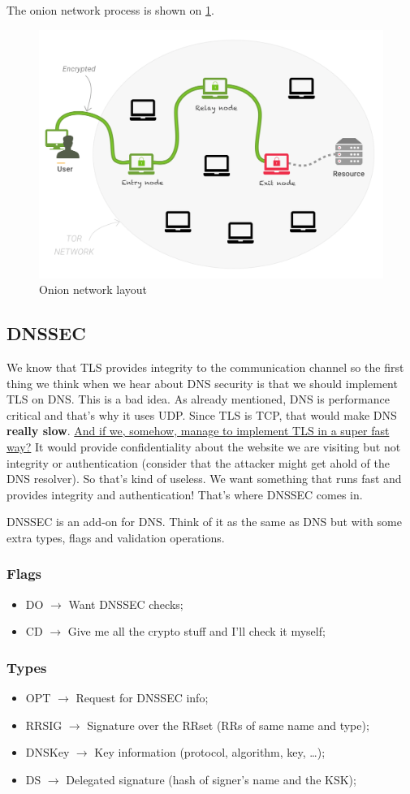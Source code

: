 \documentclass[11pt]{article}
\begin{document}
{The onion network process is shown on \ref{onion}.

\begin{figure}[htbp]
\centering
\includegraphics[height=0.5\textwidth]{res/onion.png}
\caption{\label{onion}
Onion network layout}
\end{figure}
\subsection{DNSSEC}
\label{sec:orgdc01744}
We know that TLS provides integrity to the communication channel so the first thing we think when we hear about DNS security is that we should implement TLS on DNS. This is a bad idea. As already mentioned, DNS is performance critical and that's why it uses UDP. Since TLS is TCP, that would make DNS \textbf{really slow}. \uline{And if we, somehow, manage to implement TLS in a super fast way?} It would provide confidentiality about the website we are visiting but not integrity or authentication (consider that the attacker might get ahold of the DNS resolver). So that's kind of useless. We want something that runs fast and provides integrity and authentication! That's where DNSSEC comes in.

DNSSEC is an add-on for DNS. Think of it as the same as DNS but with some extra types, flags and validation operations.
\subsubsection{Flags}
\label{sec:org5ece818}
\begin{itemize}
\item DO \(\to\) Want DNSSEC checks;
\item CD \(\to\) Give me all the crypto stuff and I'll check it myself;
\end{itemize}
\subsubsection{Types}
\label{sec:org43199f4}
\begin{itemize}
\item OPT \(\to\) Request for DNSSEC info;
\item RRSIG \(\to\) Signature over the RRset (RRs of same name and type);
\item DNSKey \(\to\) Key information (protocol, algorithm, key, \ldots{});
\item DS \(\to\) Delegated signature (hash of signer's name and the KSK);
\end{itemize}
}
\end{document}
